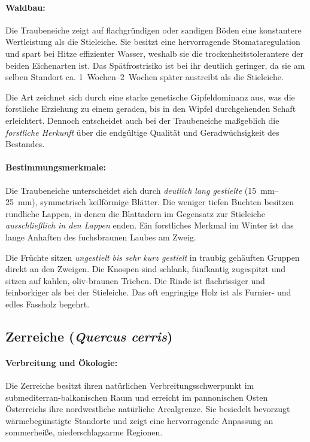 \documentclass[twocolumn, bibliography=totoc, abstract=true]{scrartcl}
\begin{document}
\paragraph{Waldbau:} 
Die Traubeneiche zeigt auf flachgründigen oder sandigen Böden eine konstantere Wertleistung als die Stieleiche. Sie besitzt eine hervorragende Stomataregulation und spart bei Hitze effizienter Wasser, weshalb sie die trockenheitstolerantere der beiden Eichenarten ist. Das Spätfrostrisiko ist bei ihr deutlich geringer, da sie am selben Standort ca. \qtyrange{1}{2}{Wochen} später austreibt als die Stieleiche.

Die Art zeichnet sich durch eine starke genetische Gipfeldominanz aus, was die forstliche Erziehung zu einem geraden, bis in den Wipfel durchgehenden Schaft erleichtert. Dennoch entscheidet auch bei der Traubeneiche maßgeblich die \emph{forstliche Herkunft} über die endgültige Qualität und Geradwüchsigkeit des Bestandes. 

\paragraph{Bestimmungsmerkmale:} 
Die Traubeneiche unterscheidet sich durch \emph{deutlich lang gestielte} (\qtyrange{15}{25}{\mm}), symmetrisch keilförmige Blätter. Die weniger tiefen Buchten besitzen rundliche Lappen, in denen die Blattadern im Gegensatz zur Stieleiche \emph{ausschließlich in den Lappen} enden. Ein forstliches Merkmal im Winter ist das lange Anhaften des fuchsbraunen Laubes am Zweig. 

Die Früchte sitzen \emph{ungestielt bis sehr kurz gestielt} in traubig gehäuften Gruppen direkt an den Zweigen. Die Knospen sind schlank, fünfkantig zugespitzt und sitzen auf kahlen, oliv-braunen Trieben. Die Rinde ist flachrissiger und feinborkiger als bei der Stieleiche. Das oft engringige Holz ist als Furnier- und edles Fassholz begehrt.

\subsection{Zerreiche (\textit{Quercus cerris})}

\paragraph{Verbreitung und Ökologie:} 
Die Zerreiche besitzt ihren natürlichen Verbreitungsschwerpunkt im submediterran-balkanischen Raum und erreicht im pannonischen Osten Österreichs ihre nordwestliche natürliche Arealgrenze. Sie besiedelt bevorzugt wärmebegünstigte Standorte und zeigt eine hervorragende Anpassung an sommerheiße, niederschlagsarme Regionen. 
\end{document}
